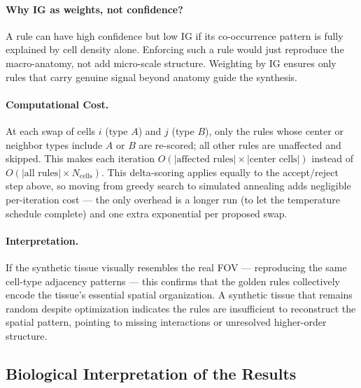 \documentclass[10pt, a4paper]{article}
\begin{document}
\paragraph{Why IG as weights, not confidence?}
A rule can have high confidence but low IG if its co-occurrence pattern is fully explained by cell density alone. Enforcing such a rule would just reproduce the macro-anatomy, not add micro-scale structure. Weighting by IG ensures only rules that carry genuine signal beyond anatomy guide the synthesis.

\paragraph{Computational Cost.}
At each swap of cells $i$ (type $A$) and $j$ (type $B$), only the rules whose center or neighbor types include $A$ or $B$ are re-scored; all other rules are unaffected and skipped. This makes each iteration $O(|\text{affected rules}| \times |\text{center cells}|)$ instead of $O(|\text{all rules}| \times N_{\text{cells}})$. This delta-scoring applies equally to the accept/reject step above, so moving from greedy search to simulated annealing adds negligible per-iteration cost — the only overhead is a longer run (to let the temperature schedule complete) and one extra exponential per proposed swap.

\paragraph{Interpretation.}
If the synthetic tissue visually resembles the real FOV — reproducing the same cell-type adjacency patterns — this confirms that the golden rules collectively encode the tissue's essential spatial organization. A synthetic tissue that remains random despite optimization indicates the rules are insufficient to reconstruct the spatial pattern, pointing to missing interactions or unresolved higher-order structure.

\subsection{Biological Interpretation of the Results}
\end{document}

